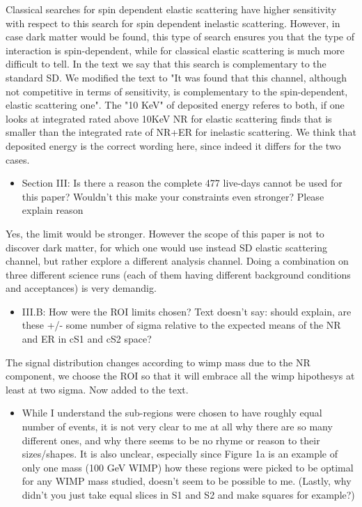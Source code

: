 \documentclass{article}
\begin{document}
Classical searches for spin dependent elastic scattering have higher sensitivity with respect to this search for spin 
dependent inelastic scattering. However, in case dark matter would be found, this type of search ensures you that the type 
of interaction is spin-dependent, while for classical elastic scattering is much more difficult to tell.
In the text we say that this search is complementary to the standard SD. {\color{red} We modified the text to "It was found that this channel,  although not competitive in terms of sensitivity,  
is complementary to the spin-dependent, elastic scattering one".} 
The "10 KeV" of deposited energy referes to both, if one looks at integrated rated above 10KeV NR for elastic scattering 
finds that is smaller than the integrated rate of  NR+ER for inelastic scattering.
{\color{red} We think that deposited energy is the correct wording here, since indeed it differs for the two cases.}

\begin{itemize}
	\item {\color{blue} 
Section III: Is there a reason the complete 477 live-days cannot be
used for this paper? Wouldn’t this make your constraints even
stronger? Please explain reason}
\end{itemize}

Yes, the limit would be stronger. However the scope of this paper is 
not to discover dark matter, for which one would use instead SD elastic
scattering channel, but rather explore a different analysis channel.
Doing a combination on three different science runs (each of them having 
different background conditions and acceptances) is very demandig. 


\begin{itemize}
	\item {\color{blue} 
III.B: How were the ROI limits chosen? Text doesn’t say: should
explain, are these +/- some number of sigma relative to the expected
means of the NR and ER in cS1 and cS2 space?}
\end{itemize}

The signal distribution changes according to wimp mass due to the NR component,
we choose the ROI so that it will embrace all the wimp hipothesys at least at two 
sigma. Now added to the text.


\begin{itemize}
	\item {\color{blue} 
While I understand the sub-regions were chosen to have roughly equal
number of events, it is not very clear to me at all why there are so
many different ones, and why there seems to be no rhyme or reason to
their sizes/shapes. It is also unclear, especially since Figure 1a is
an example of only one mass (100 GeV WIMP) how these regions were
picked to be optimal for any WIMP mass studied, doesn’t seem to be
possible to me. (Lastly, why didn’t you just take equal slices in S1
and S2 and make squares for example?)}
\end{itemize}
\end{document}
